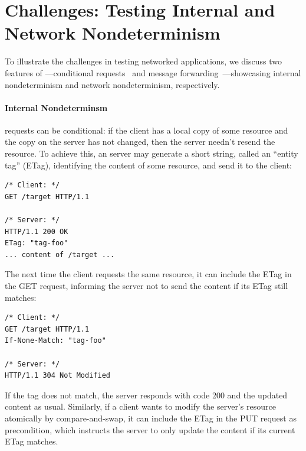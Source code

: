 \section{Challenges: Testing Internal and Network Nondeterminism}
\label{sec:challenge}
To illustrate the challenges in testing networked applications, we discuss two
features of \http---conditional requests~\cite{rfc7232}
and message forwarding~\cite{rfc7231}---showcasing internal nondeterminism
and network nondeterminism, respectively.

\paragraph*{Internal Nondeterminsm}
\http requests can be conditional: if the client has a local copy of some
resource and the copy on the server has not changed, then the server needn't
resend the resource.  To
achieve this, an \http server may generate a short string, called an ``entity tag'' (ETag), identifying the
content of some resource, and send it to
the client: %
\begin{lstlisting}[style=customc]
/* Client: */
GET /target HTTP/1.1

/* Server: */
HTTP/1.1 200 OK
ETag: "tag-foo"
... content of /target ...
\end{lstlisting}
The next time the client requests the same resource, it can include the ETag in
the GET request, informing the server not to send the content if its ETag
still matches:

\begin{lstlisting}[style=customc]
/* Client: */
GET /target HTTP/1.1
If-None-Match: "tag-foo"

/* Server: */
HTTP/1.1 304 Not Modified
\end{lstlisting}
If the tag does not
match, the server responds with code 200 and the updated content as usual.
%
Similarly, if a client wants to modify the server's resource atomically by
compare-and-swap, it can include the ETag in the PUT request as  precondition, which
instructs the server to only update the content if its current ETag matches.
%

